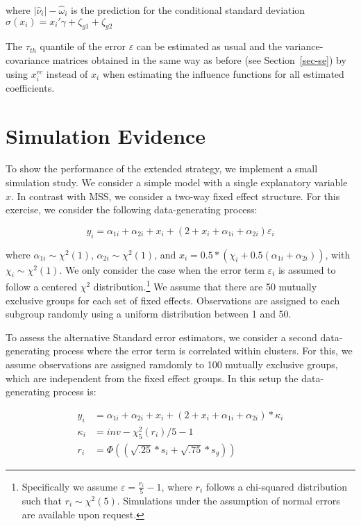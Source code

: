 \documentclass[
  authoryear,
  review,
  1p]{elsarticle}
\begin{document}
where \(|\hat\nu_{i}|- \hat \omega_{i}\) is the prediction for the
conditional standard deviation
\(\sigma(x_i)=x_{i}' \gamma + \zeta_{g1} + \zeta_{g2}\)

The \(\tau_{th}\) quantile of the error \(\varepsilon\) can be estimated
as usual and the variance-covariance matrices obtained in the same way
as before (see Section~\ref{sec-se}) by using \(x_{i}^{rc}\) instead of
\(x_{i}\) when estimating the influence functions for all estimated
coefficients.

\section{Simulation Evidence}\label{simulation-evidence}

To show the performance of the extended strategy, we implement a small
simulation study. We consider a simple model with a single explanatory
variable \(x\). In contrast with MSS, we consider a two-way fixed effect
structure. For this exercise, we consider the following data-generating
process:

\[y_i = \alpha_{1i} + \alpha_{2i} + x_i + (2+x_i + \alpha_{1i} + \alpha_{2i} ) \varepsilon_i
\]

where \(\alpha_{1i}\sim \chi^2(1)\), \(\alpha_{2i} \sim \chi^2(1)\), and
\(x_i = 0.5 * (\chi_i +0.5(\alpha_{1i}+\alpha_{2i}))\), with
\(\chi_i \sim \chi^2(1)\). We only consider the case when the error term
\(\varepsilon_i\) is assumed to follow a centered \(\chi^2\)
distribution.\footnote{Specifically we assume
  \(\varepsilon=\frac{r_i}{5}-1\), where \(r_i\) follows a chi-squared
  distribution such that \(r_i \sim \chi^2(5)\). Simulations under the
  assumption of normal errors are available upon request.} We assume
that there are 50 mutually exclusive groups for each set of fixed
effects. Observations are assigned to each subgroup randomly using a
uniform distribution between 1 and 50.

To assess the alternative Standard error estimators, we consider a
second data-generating process where the error term is correlated within
clusters. For this, we assume observations are assigned ramdomly to 100
mutually exclusive groups, which are independent from the fixed effect
groups. In this setup the data-generating process is:

\[\begin{aligned}
y_i &= \alpha_{1i} + \alpha_{2i} + x_i + (2+x_i + \alpha_{1i} + \alpha_{2i} )*\kappa_i \\
\kappa_i &= inv-\chi^2_5(r_{i})/5-1 \\
r_i &= \Phi((\sqrt{.25}*s_{i}+\sqrt{.75}*s_{g}))
\end{aligned}
\]
\end{document}
